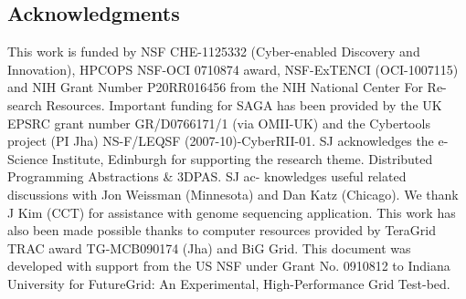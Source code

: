 \documentclass{acm_proc_article-sp}
\begin{document}
%

%
%
%


\subsection*{Acknowledgments}
\scriptsize
This work is funded by NSF CHE-1125332 (Cyber-enabled Discovery and
Innovation), HPCOPS NSF-OCI 0710874 award, NSF-ExTENCI (OCI-1007115) and NIH
Grant Number P20RR016456 from the NIH National Center For Re- search
Resources. Important funding for SAGA has been provided by the UK EPSRC grant
number GR/D0766171/1 (via OMII-UK) and the Cybertools project (PI Jha) 
NS-F/LEQSF (2007-10)-CyberRII-01. SJ acknowledges the e-Science Institute,
Edinburgh for supporting the research theme. Distributed Programming
Abstractions \& 3DPAS. SJ ac- knowledges useful related discussions with Jon
Weissman (Minnesota) and Dan Katz (Chicago). We thank J Kim (CCT) for
assistance with genome sequencing application. This work has also been made
possible thanks to computer resources provided by TeraGrid TRAC award
TG-MCB090174 (Jha) and BiG Grid. This document was developed with support from
the US NSF under Grant No. 0910812 to Indiana University for FutureGrid: An
Experimental, High-Performance Grid Test-bed.
\end{document}
